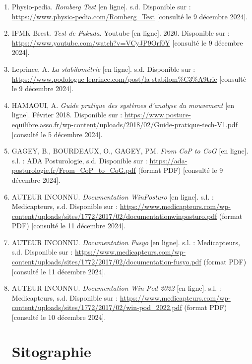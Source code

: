 \begin{enumerate}
    \item \label{source:8} Physio-pedia. \emph{Romberg Test} [en ligne]. s.d. Disponible sur : \url{https://www.physio-pedia.com/Romberg_Test} [consulté le 9 décembre 2024].

    \item \label{source:9} IFMK Brest. \emph{Test de Fukuda}. Youtube [en ligne]. 2020. Disponible sur : \url{https://www.youtube.com/watch?v=VCyJP9Orf0Y} [consulté le 9 décembre 2024].

    \item \label{source:10} Leprince, A. \emph{La stabilométrie} [en ligne]. s.d. Disponible sur : \url{https://www.podologue-leprince.com/post/la-stabilom%C3%A9trie} [consulté le 9 décembre 2024].

    \item \label{source:11} HAMAOUI, A. \emph{Guide pratique des systèmes d’analyse du mouvement} [en ligne]. Février 2018. Disponible sur : \url{https://www.posture-equilibre.asso.fr/wp-content/uploads/2018/02/Guide-pratique-tech-V1.pdf} [consulté le 5 décembre 2024].

    \item \label{source:12} GAGEY, B., BOURDEAUX, O., GAGEY, PM. \emph{From CoP to CoG} [en ligne]. s.l. : ADA Posturologie, s.d. Disponible sur : \url{https://ada-posturologie.fr/From_CoP_to_CoG.pdf} (format PDF) [consulté le 9 décembre 2024].

    \item \label{source:13} AUTEUR INCONNU. \emph{Documentation WinPosturo} [en ligne]. s.l. : Medicapteurs, s.d. Disponible sur : \url{https://www.medicapteurs.com/wp-content/uploads/sites/1772/2017/02/documentationwinposturo.pdf} (format PDF) [consulté le 11 décembre 2024].

    \item \label{source:14} AUTEUR INCONNU. \emph{Documentation Fusyo} [en ligne]. s.l. : Medicapteurs, s.d. Disponible sur : \url{https://www.medicapteurs.com/wp-content/uploads/sites/1772/2017/02/documentation-fusyo.pdf} (format PDF) [consulté le 11 décembre 2024].

    \item \label{source:15} AUTEUR INCONNU. \emph{Documentation Win-Pod 2022} [en ligne]. s.l. : Medicapteurs, s.d. Disponible sur : \url{https://www.medicapteurs.com/wp-content/uploads/sites/1772/2017/02/win-pod_2022.pdf} (format PDF) [consulté le 10 décembre 2024].

    \section*{Sitographie}
    

\end{enumerate}
